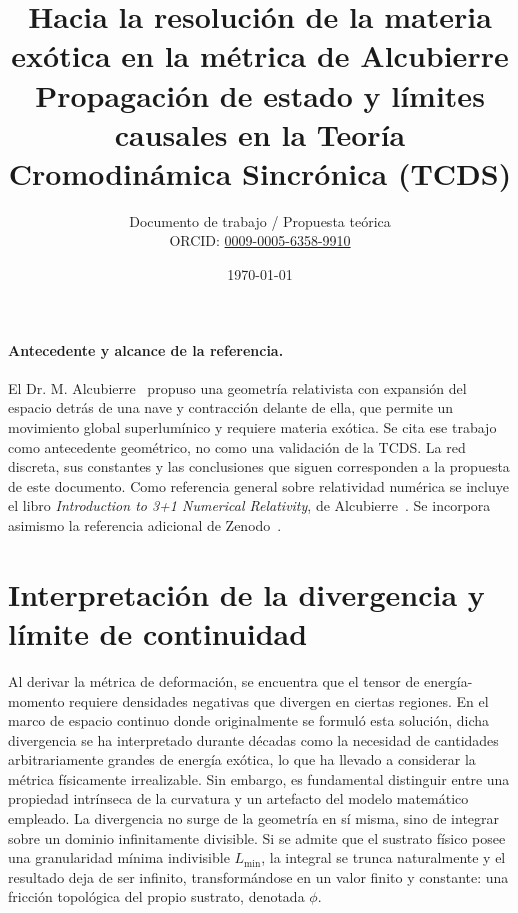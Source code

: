 \documentclass[10pt,a4paper,twocolumn]{article}
\title{\textbf{Hacia la resolución de la materia exótica en la métrica de Alcubierre}\\[0.5em]
    \large Propagación de estado y límites causales en la Teoría Cromodinámica Sincrónica (TCDS)}
\author{Documento de trabajo / Propuesta teórica\\[0.4em]
    \small ORCID: \href{https://orcid.org/0009-0005-6358-9910}{0009-0005-6358-9910}}
\date{\today}
\begin{document}

\paragraph{Antecedente y alcance de la referencia.}
El Dr. M. Alcubierre~\cite{alcubierre1994} propuso una geometría relativista con expansión del espacio detrás de una nave y contracción delante de ella, que permite un movimiento global superlumínico y requiere materia exótica. Se cita ese trabajo como antecedente geométrico, no como una validación de la TCDS. La red discreta, sus constantes y las conclusiones que siguen corresponden a la propuesta de este documento.
Como referencia general sobre relatividad numérica se incluye el libro \textit{Introduction to 3+1 Numerical Relativity}, de Alcubierre~\cite{alcubierre2008}. Se incorpora asimismo la referencia adicional de Zenodo~\cite{zenodo22639220}.

\section{Interpretación de la divergencia y límite de continuidad}
\label{sec:interpretacion-divergencia}

Al derivar la métrica de deformación, se encuentra que el tensor de energía-momento requiere densidades negativas que divergen en ciertas regiones. En el marco de espacio continuo donde originalmente se formuló esta solución, dicha divergencia se ha interpretado durante décadas como la necesidad de cantidades arbitrariamente grandes de energía exótica, lo que ha llevado a considerar la métrica físicamente irrealizable. Sin embargo, es fundamental distinguir entre una propiedad intrínseca de la curvatura y un artefacto del modelo matemático empleado. La divergencia no surge de la geometría en sí misma, sino de integrar sobre un dominio infinitamente divisible. Si se admite que el sustrato físico posee una granularidad mínima indivisible \(L_{\text{min}}\), la integral se trunca naturalmente y el resultado deja de ser infinito, transformándose en un valor finito y constante: una fricción topológica del propio sustrato, denotada \(\phi\).
\end{document}
